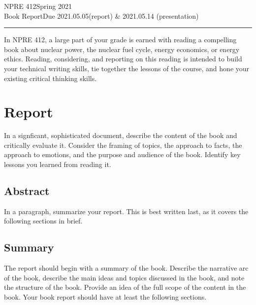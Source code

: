 \documentclass{article}
\newcommand{\class}{NPRE 412}
\newcommand{\term}{Spring 2021}
\newcommand{\assignment}{Book Report}
\newcommand{\duedate}{2021.05.05}
\begin{document}
 


\class \hfill \term \\
\assignment \hfill Due \duedate (report) \& 2021.05.14 (presentation)\\
\rule[1ex]{\textwidth}{.1pt}


In NPRE 412, a large part of your grade is earned with reading a compelling 
book about nuclear power, the nuclear fuel cycle, energy economics, or energy 
ethics. Reading, considering, and reporting on this reading is intended to 
build your technical writing skills, tie together the lessons of the course, 
and hone your existing critical thinking skills.

\section{Report}
In a signficant, sophisticated document, describe the content of the book and 
critically evaluate it. Consider the framing of topics, the approach to facts, 
the approach to emotions, and the purpose and audience of the book. Identify 
key lessons you learned from reading it.

\subsection{Abstract}
In a paragraph, summarize your report. This is best written last, as it covers the following sections in brief.

\subsection{Summary}
The report should begin with a summary of the book. Describe the narrative arc 
of the book, describe the main ideas and topics discussed in the book, and note 
the structure of the book. Provide an idea of the full scope of the content in 
the book. Your book report should have at least the following sections.
\end{document}
